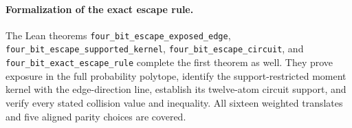 \paragraph{Formalization of the exact escape rule.} The Lean theorems \texttt{four\_\allowbreak bit\_\allowbreak escape\_\allowbreak exposed\_\allowbreak edge}, \texttt{four\_\allowbreak bit\_\allowbreak escape\_\allowbreak supported\_\allowbreak kernel}, \texttt{four\_\allowbreak bit\_\allowbreak escape\_\allowbreak circuit}, and \texttt{four\_\allowbreak bit\_\allowbreak exact\_\allowbreak escape\_\allowbreak rule} complete the first theorem as well. They prove exposure in the full probability polytope, identify the support-restricted moment kernel with the edge-direction line, establish its twelve-atom circuit support, and verify every stated collision value and inequality. All sixteen weighted translates and five aligned parity choices are covered.
